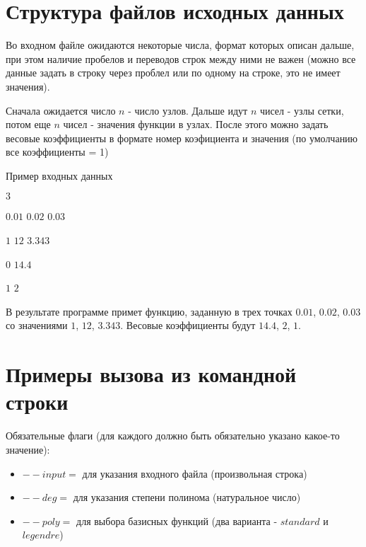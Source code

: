 \documentclass[paper=a4, fontsize=11pt]{scrartcl} %
\numberwithin{equation}{section} %
\numberwithin{figure}{section} %
\numberwithin{table}{section} %
\begin{document}

\section{Структура файлов исходных данных}

Во входном файле ожидаются некоторые числа, формат которых описан дальше, при этом наличие пробелов и переводов строк между ними не важен (можно все данные задать в строку через проблел или по одному на строке, это не имеет значения).

Сначала ожидается число $n$ - число узлов.
Дальше идут $n$ чисел - узлы сетки, потом еще $n$ чисел - значения функции в узлах.
После этого можно задать весовые коэффициенты в формате номер коэфициента и значения (по умолчанию все коэффициенты = 1)

Пример входных данных

$3$

$0.01$ $0.02$ $0.03$

$1$ $12$ $3.343$


$0$ $14.4$

$1$ $2$

В результате программе примет функцию, заданную в трех точках $0.01$, $0.02$, $0.03$ со значениями $1$, $12$, $3.343$. Весовые коэффициенты будут $14.4$, $2$, $1$.


\section{Примеры вызова из командной строки}

Обязательные флаги (для каждого должно быть обязательно указано какое-то значение):

\begin{itemize}
	\item $--input=$ для указания входного файла (произвольная строка)
    \item $--deg=$ для указания степени полинома (натуральное число)
    \item $--poly=$ для выбора базисных функций (два варианта - $standard$ и $legendre$)
\end{itemize}
\end{document}

